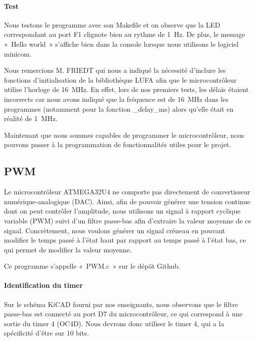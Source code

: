 \documentclass[12pt, a4paper, titlepage]{article}
\begin{document}
\paragraph{Test}

Nous testons le programme avec son Makefile et on observe que la LED correspondant au port F1 clignote bien au rythme de \SI{1}{\hertz}. De plus, le message «~Hello world~» s'affiche bien dans la console lorsque nous utilisons le logiciel minicom.

\bigskip

Nous remercions M. FRIEDT qui nous a indiqué la nécessité d'inclure les fonctions d'initialisation de la bibliothèque LUFA afin que le microcontrôleur utilise l'horloge de \SI{16}{\mega\hertz}. En effet, lors de nos premiers tests, les délais étaient incorrects car nous avons indiqué que la fréquence est de \SI{16}{\mega\hertz} dans les programmes (notamment pour la fonction \_delay\_ms) alors qu'elle était en réalité de \SI{1}{\mega\hertz}.

Maintenant que nous sommes capables de programmer le microcontrôleur, nous pouvons passer à la programmation de fonctionnalités utiles pour le projet.

\subsection{PWM} \label{Section - Programmation - PWM}

Le microcontrôleur ATMEGA32U4 ne comporte pas directement de convertisseur numérique-analogique (DAC). Ainsi, afin de pouvoir générer une tension continue dont on peut contrôler l'amplitude, nous utilisons un signal à rapport cyclique variable (PWM) suivi d'un filtre passe-bas afin d'extraire la valeur moyenne de ce signal. Concrètement, nous voulons générer un signal créneau en pouvant modifier le temps passé à l'état haut par rapport au temps passé à l'état bas, ce qui permet de modifier la valeur moyenne.

Ce programme s'appelle «~PWM.c~» sur le dépôt Github.

\paragraph{Identification du timer}

Sur le schéma KiCAD fourni par nos enseignants, nous observons que le filtre passe-bas est connecté au port D7 du microcontrôleur, ce qui correspond à une sortie du timer 4 (OC4D). Nous devrons donc utiliser le timer 4, qui a la spécificité d'être sur 10 bits.
\end{document}
